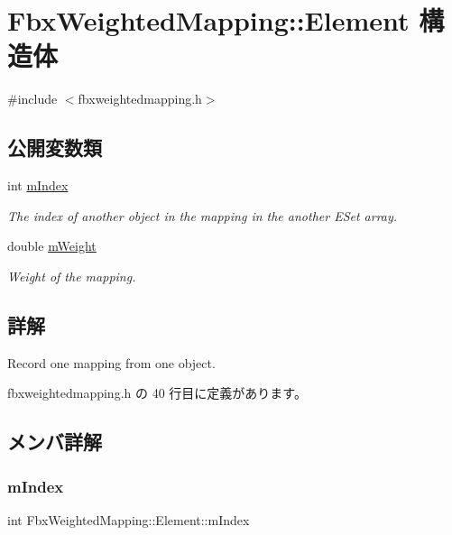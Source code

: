 \hypertarget{struct_fbx_weighted_mapping_1_1_element}{}\section{Fbx\+Weighted\+Mapping\+:\+:Element 構造体}
\label{struct_fbx_weighted_mapping_1_1_element}


{\ttfamily \#include $<$fbxweightedmapping.\+h$>$}

\subsection*{公開変数類}
\begin{DoxyCompactItemize}
\item 
int \hyperlink{struct_fbx_weighted_mapping_1_1_element_a7ae86aad8539b57b926ac5c5c56c5a04}{m\+Index}
\begin{DoxyCompactList}\small\item\em The index of another object in the mapping in the another E\+Set array. \end{DoxyCompactList}\item 
double \hyperlink{struct_fbx_weighted_mapping_1_1_element_aa078b1f7b0a995f487530342dc9b0038}{m\+Weight}
\begin{DoxyCompactList}\small\item\em Weight of the mapping. \end{DoxyCompactList}\end{DoxyCompactItemize}


\subsection{詳解}
Record one mapping from one object. 

 fbxweightedmapping.\+h の 40 行目に定義があります。



\subsection{メンバ詳解}
\mbox{\label{struct_fbx_weighted_mapping_1_1_element_a7ae86aad8539b57b926ac5c5c56c5a04}} 
\subsubsection{\texorpdfstring{m\+Index}{mIndex}}
{\footnotesize\ttfamily int Fbx\+Weighted\+Mapping\+::\+Element\+::m\+Index}



